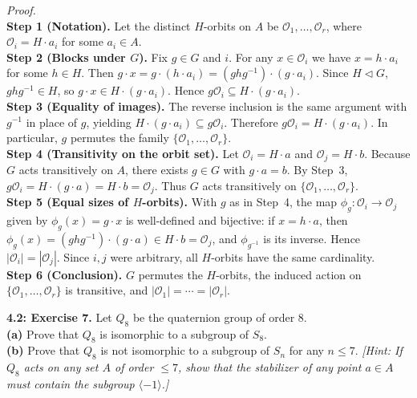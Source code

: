 \documentclass[11pt]{article}
\theoremstyle{definition}
\begin{document}
\emph{Proof.}\\
\textbf{Step 1 (Notation).} Let the distinct $H$-orbits on $A$ be $\mathcal O_1,\dots,\mathcal O_r$, where $\mathcal O_i=H\cdot a_i$ for some $a_i\in A$.\\
\textbf{Step 2 (Blocks under $G$).} Fix $g\in G$ and $i$. For any $x\in\mathcal O_i$ we have $x=h\cdot a_i$ for some $h\in H$. Then $g\cdot x=g\cdot(h\cdot a_i)=(ghg^{-1})\cdot(g\cdot a_i)$. Since $H\lhd G$, $ghg^{-1}\in H$, so $g\cdot x\in H\cdot(g\cdot a_i)$. Hence $g\mathcal O_i\subseteq H\cdot(g\cdot a_i)$.\\
\textbf{Step 3 (Equality of images).} The reverse inclusion is the same argument with $g^{-1}$ in place of $g$, yielding $H\cdot(g\cdot a_i)\subseteq g\mathcal O_i$. Therefore $g\mathcal O_i=H\cdot(g\cdot a_i)$. In particular, $g$ permutes the family $\{\mathcal O_1,\dots,\mathcal O_r\}$.\\
\textbf{Step 4 (Transitivity on the orbit set).} Let $\mathcal O_i=H\cdot a$ and $\mathcal O_j=H\cdot b$. Because $G$ acts transitively on $A$, there exists $g\in G$ with $g\cdot a=b$. By Step~3, $g\mathcal O_i=H\cdot(g\cdot a)=H\cdot b=\mathcal O_j$. Thus $G$ acts transitively on $\{\mathcal O_1,\dots,\mathcal O_r\}$.\\
\textbf{Step 5 (Equal sizes of $H$-orbits).} With $g$ as in Step~4, the map $\phi_g:\mathcal O_i\to\mathcal O_j$ given by $\phi_g(x)=g\cdot x$ is well-defined and bijective: if $x=h\cdot a$, then $\phi_g(x)=(ghg^{-1})\cdot(g\cdot a)\in H\cdot b=\mathcal O_j$, and $\phi_{g^{-1}}$ is its inverse. Hence $|\mathcal O_i|=|\mathcal O_j|$. Since $i,j$ were arbitrary, all $H$-orbits have the same cardinality.\\
\textbf{Step 6 (Conclusion).} $G$ permutes the $H$-orbits, the induced action on $\{\mathcal O_1,\dots,\mathcal O_r\}$ is transitive, and $|\mathcal O_1|=\cdots=|\mathcal O_r|$.\\

\newpage

\newpage

\noindent \textbf{4.2: Exercise 7.} Let $Q_8$ be the quaternion group of order $8$.\\ %
\textbf{(a)} Prove that $Q_8$ is isomorphic to a subgroup of $S_8$.\\
\textbf{(b)} Prove that $Q_8$ is not isomorphic to a subgroup of $S_n$ for any $n\le 7$. \emph{[Hint: If $Q_8$ acts on any set $A$ of order $\le 7$, show that the stabilizer of any point $a\in A$ must contain the subgroup $\langle -1\rangle$.]}\\
\end{document}
